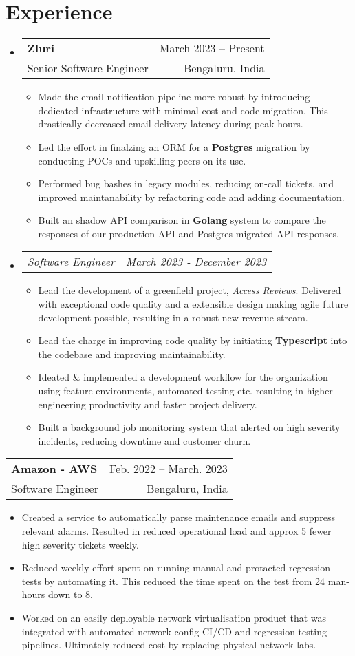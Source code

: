 \documentclass[a4paper,11pt]{article}
\makeatletter
\newcommand{\resumeItem}[1]{
  \item\small{
    {#1 \vspace{-2pt}}
  }
}
\newcommand{\resumeSubheading}[4]{
  \vspace{-2pt}\item
    \begin{tabular*}{0.97\textwidth}[t]{l@{\extracolsep{\fill}}r}
      \textbf{#1} & #2 \\
		  {\small#3} & {\small #4} \\
    \end{tabular*}\vspace{-4pt}
}
\newcommand{\resumeSubSubheading}[2]{
    \item
    \begin{tabular*}{0.97\textwidth}{l@{\extracolsep{\fill}}r}
      \textit{\small#1} & \textit{\small #2} \\
    \end{tabular*}\vspace{-5pt}
}
\newcommand{\resumeSubHeadingListStart}{\begin{itemize}[leftmargin=0.15in, label={}]}
\newcommand{\resumeSubHeadingListEnd}{\end{itemize}}
\newcommand{\resumeItemListStart}{\begin{itemize}}
\newcommand{\resumeItemListEnd}{\end{itemize}\vspace{-5pt}}
\makeatother
\begin{document}
\section{Experience}
  \resumeSubHeadingListStart
    \resumeSubheading
      {Zluri}{March 2023 -- Present}
      {Senior Software Engineer}{Bengaluru, India}
    \resumeItemListStart
      \resumeItem{Made the email notification pipeline more robust by introducing dedicated infrastructure with minimal cost and code migration. This drastically decreased email delivery latency during peak hours.}
      \resumeItem{Led the effort in finalzing an ORM for a \textbf{Postgres} migration by conducting POCs and upskilling peers on its use.}
      \resumeItem{Performed bug bashes in legacy modules, reducing on-call tickets, and improved maintanability by refactoring code and adding documentation.}
      \resumeItem{Built an shadow API comparison in \textbf{Golang} system to compare the responses of our production API and Postgres-migrated API responses.}
    \resumeItemListEnd

   \resumeSubSubheading
      {Software Engineer}{March 2023 - December 2023}
      \resumeItemListStart
        \resumeItem{Lead the development of a greenfield project, \textit{Access Reviews}. Delivered with exceptional code quality and a extensible design making agile future development possible, resulting in a robust new revenue stream.}
        \resumeItem{Lead the charge in improving code quality by initiating \textbf{Typescript} into the codebase and improving maintainability.}
        \resumeItem{Ideated \& implemented a development workflow for the organization using feature environments, automated testing etc. resulting in higher engineering productivity and faster project delivery.}
      \resumeItem{Built a background job monitoring system that alerted on high severity incidents, reducing downtime and customer churn.}
      \resumeItemListEnd
   \resumeSubHeadingListEnd

    \resumeSubheading
			{Amazon - AWS}{Feb. 2022 -- March. 2023}
			{Software Engineer}{Bengaluru, India}
      \resumeItemListStart
						\resumeItem{Created a service to automatically parse maintenance emails and suppress relevant alarms.  Resulted in reduced operational load and approx 5 fewer high severity tickets weekly.}
						\resumeItem{Reduced weekly effort spent on running manual and protacted regression tests by automating it.  This reduced the time spent on the test from 24 man-hours down to 8.}
						\resumeItem{Worked on an easily deployable network virtualisation product that was integrated with automated network config CI/CD and regression testing pipelines. Ultimately reduced cost by replacing physical network labs.}
      \resumeItemListEnd
\end{document}
